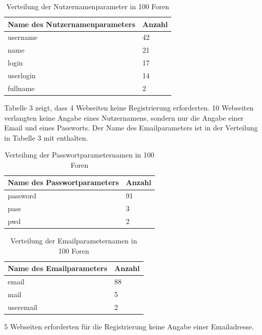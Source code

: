 
\begin{table}[h!]
\centering 
\begin{tabular}{ | p{7cm} | p{3cm}|} \hline
\textbf{Name des Nutzernamenparameters} &\textbf{Anzahl} \\ \hline
username & 42 \\ \hline
name & 21 \\ \hline
login & 17 \\ \hline
userlogin & 14 \\ \hline
fullname & 2 \\ \hline
\end{tabular}
\caption{Verteilung der Nutzernamenparameter in 100 Foren}
\end{table}

Tabelle 3 zeigt, dass 4 Webseiten keine Registrierung erforderten.
10 Webseiten verlangten keine Angabe eines Nutzernamens, sondern nur die Angabe einer Email und eines Passworts. Der Name des Emailparameters ist in der Verteilung in Tabelle 3 mit enthalten.

\begin{table}[h!]
\centering 
\begin{tabular}{ | p{7cm} | p{3cm}|} \hline
\textbf{Name des Passwortparameters} & \textbf{Anzahl} \\ \hline
password & 91 \\ \hline
pass & 3 \\ \hline
pwd & 2 \\ \hline
\end{tabular}
\caption{Verteilung der Passwortparameternamen in 100 Foren}
\end{table}

\begin{table}[h!]
\centering 
\begin{tabular}{ | p{7cm} | p{3cm}|} \hline
\textbf{Name des Emailparameters} & \textbf{Anzahl} \\ \hline
email & 88 \\ \hline
mail & 5 \\ \hline
useremail & 2 \\ \hline
\end{tabular}
\caption{Verteilung der Emailparameternamen in 100 Foren}
\end{table}

5 Webseiten erforderten für die Registrierung keine Angabe einer Emailadresse.


